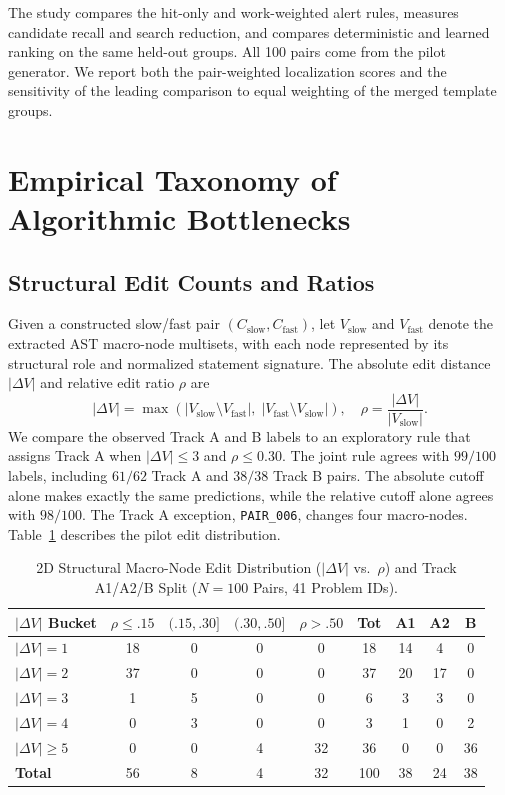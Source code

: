 \documentclass[10pt,conference]{IEEEtran}
\begin{document}
The study compares the hit-only and work-weighted alert rules, measures candidate recall and search reduction, and compares deterministic and learned ranking on the same held-out groups. All 100 pairs come from the pilot generator. We report both the pair-weighted localization scores and the sensitivity of the leading comparison to equal weighting of the merged template groups.

\section{Empirical Taxonomy of Algorithmic Bottlenecks}
\label{sec:taxonomy}

\subsection{Structural Edit Counts and Ratios}
Given a constructed slow/fast pair $(C_{\text{slow}}, C_{\text{fast}})$, let $V_{\text{slow}}$ and $V_{\text{fast}}$ denote the extracted AST macro-node multisets, with each node represented by its structural role and normalized statement signature. The absolute edit distance $|\Delta V|$ and relative edit ratio $\rho$ are
\begin{equation}
|\Delta V| = \max\!\left(|V_{\text{slow}} \setminus V_{\text{fast}}|,\; |V_{\text{fast}} \setminus V_{\text{slow}}|\right), \quad \rho = \frac{|\Delta V|}{|V_{\text{slow}}|}.
\end{equation}
We compare the observed Track A and B labels to an exploratory rule that assigns Track A when $|\Delta V|\leq 3$ and $\rho\leq 0.30$. The joint rule agrees with $99/100$ labels, including $61/62$ Track A and $38/38$ Track B pairs. The absolute cutoff alone makes exactly the same predictions, while the relative cutoff alone agrees with $98/100$. The Track A exception, \texttt{PAIR\_006}, changes four macro-nodes. Table~\ref{tab:pilot_edit_dist} describes the pilot edit distribution.

\begin{table}[t]
\centering
\caption{2D Structural Macro-Node Edit Distribution ($|\Delta V|$ vs.\ $\rho$) and Track A1/A2/B Split ($N=100$ Pairs, 41 Problem IDs).}
\label{tab:pilot_edit_dist}
\setlength{\tabcolsep}{2.5pt}
\begin{tabular}{@{}lcccccccc@{}}
\toprule
\textbf{$|\Delta V|$ Bucket} & \textbf{$\rho \le .15$} & \textbf{$(.15, .30]$} & \textbf{$(.30, .50]$} & \textbf{$\rho > .50$} & \textbf{Tot} & \textbf{A1} & \textbf{A2} & \textbf{B} \\
\midrule
$|\Delta V| = 1$ & 18 & 0 & 0 & 0 & 18 & 14 & 4 & 0 \\
$|\Delta V| = 2$ & 37 & 0 & 0 & 0 & 37 & 20 & 17 & 0 \\
$|\Delta V| = 3$ & 1 & 5 & 0 & 0 & 6 & 3 & 3 & 0 \\
$|\Delta V| = 4$ & 0 & 3 & 0 & 0 & 3 & 1 & 0 & 2 \\
$|\Delta V| \ge 5$ & 0 & 0 & 4 & 32 & 36 & 0 & 0 & 36 \\
\midrule
\textbf{Total} & 56 & 8 & 4 & 32 & 100 & 38 & 24 & 38 \\
\bottomrule
\end{tabular}
\end{table}
\end{document}
